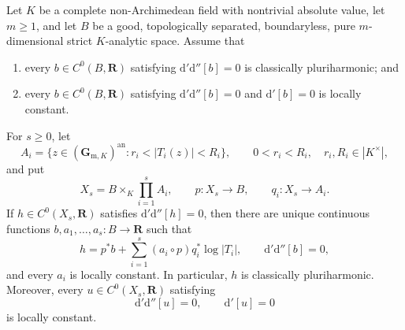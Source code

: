 \begin{proposition}
\label{prop:p062-open-polyannulus-rigid-base}
Let \(K\) be a complete non-Archimedean field with nontrivial absolute
value, let \(m\geq1\), and let \(B\) be a good, topologically separated,
boundaryless, pure \(m\)-dimensional strict \(K\)-analytic space.  Assume
that
\begin{enumerate}
\item every \(b\in C^0(B,\mathbf R)\) satisfying
  \(\mathrm d'\mathrm d''[b]=0\) is classically pluriharmonic; and
\item every \(b\in C^0(B,\mathbf R)\) satisfying
  \(\mathrm d'\mathrm d''[b]=0\) and \(\mathrm d'[b]=0\) is locally
  constant.
\end{enumerate}
For \(s\geq0\), let
\[
 A_i=\{z\in(\mathbf G_{\mathrm m,K})^{\mathrm{an}}:
                     r_i<|T_i(z)|<R_i\},
 \qquad 0<r_i<R_i,\quad r_i,R_i\in|K^\times|,
\]
and put
\[
 X_s=B\times_K\prod_{i=1}^sA_i,
 \qquad p:X_s\longrightarrow B,
 \qquad q_i:X_s\longrightarrow A_i.
\]
If \(h\in C^0(X_s,\mathbf R)\) satisfies
\(\mathrm d'\mathrm d''[h]=0\), then there are unique continuous
functions \(b,a_1,\ldots,a_s:B\to\mathbf R\) such that
\[
 h=p^*b+\sum_{i=1}^s(a_i\circ p)q_i^*\log|T_i|,
 \qquad \mathrm d'\mathrm d''[b]=0,
\]
and every \(a_i\) is locally constant.  In particular, \(h\) is
classically pluriharmonic.  Moreover, every
\(u\in C^0(X_s,\mathbf R)\) satisfying
\[
             \mathrm d'\mathrm d''[u]=0,
             \qquad \mathrm d'[u]=0
\]
is locally constant.
\end{proposition}

